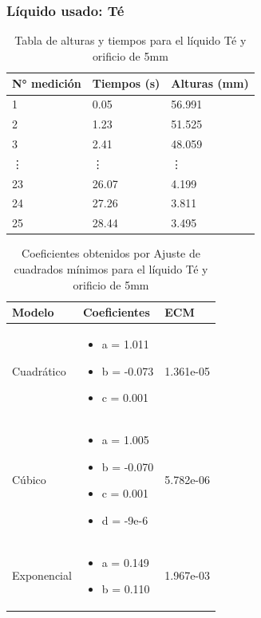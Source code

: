 \documentclass{article}
\begin{document}
\subsubsection{Líquido usado: Té}
\begin{table}[h]
    \begin{center}
        \begin{tabular}{ | m{2cm} | m{2cm} | m{2cm} | }
            \hline N° medición & Tiempos (s) & Alturas (mm) \\ 
            \hline 1 & 0.05 & 56.991 \\
            \hline 2 & 1.23 & 51.525 \\
            \hline 3 & 2.41 & 48.059 \\
            \hline \vdots & \vdots & \vdots \\            
            \hline 23 & 26.07 & 4.199 \\
            \hline 24 & 27.26 & 3.811 \\
            \hline 25 & 28.44 & 3.495 \\
            \hline
        \end{tabular}
    \end{center}
    \caption{Tabla de alturas y tiempos para el líquido Té y orificio de 5mm}
\end{table}

\begin{table}[h]
    \begin{center}
        \begin{tabular}{ | m{2cm} | m{5cm} | m{2cm} | }
            \hline Modelo & Coeficientes & ECM \\ 
            \hline Cuadrático & \begin{itemize}
                \item a = 1.011
                \item b = -0.073
                \item c = 0.001
            \end{itemize} & 1.361e-05 \\
            \hline Cúbico & \begin{itemize}
                \item a = 1.005
                \item b = -0.070
                \item c = 0.001
                \item d = -9e-6
            \end{itemize} & 5.782e-06 \\
            \hline Exponencial & \begin{itemize}
                \item a = 0.149
                \item b = 0.110
            \end{itemize} & 1.967e-03 \\
            \hline
        \end{tabular}
    \end{center}
    \caption{Coeficientes obtenidos por Ajuste de cuadrados mínimos para el líquido Té y orificio de 5mm}
\end{table}
\end{document}
